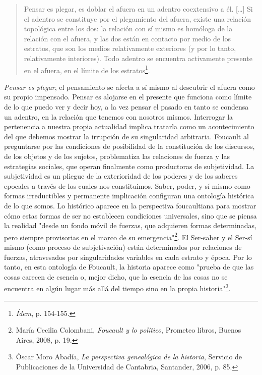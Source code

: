 \documentclass{book}
\begin{document}
\begin{quote}
Pensar es plegar, es doblar el afuera en un adentro coextensivo a él.
{[}\ldots{]} Si el adentro se constituye por el plegamiento del afuera,
existe una relación topológica entre los dos: la relación con sí mismo
es homóloga de la relación con el afuera, y las dos están en contacto
por medio de los estratos, que son los medios relativamente exteriores
(y por lo tanto, relativamente interiores). Todo adentro se encuentra
activamente presente en el afuera, en el límite de los
estratos\footnote{\emph{Ídem}, p. 154-155.}.
\end{quote}

\emph{Pensar es plegar}, el pensamiento se afecta a sí mismo al
descubrir el afuera como su propio impensado. Pensar es alojarse en el
presente que funciona como límite de lo que puedo ver y decir hoy, a la
vez pensar el pasado en tanto se condensa un adentro, en la relación que
tenemos con nosotros mismos. Interrogar la pertenencia a nuestra propia
actualidad implica tratarla como un acontecimiento del que debemos
mostrar la irrupción de su singularidad arbitraria. Foucault al
preguntarse por las condiciones de posibilidad de la constitución de los
discursos, de los objetos y de los sujetos, problematiza las relaciones
de fuerza y las estrategias sociales, que operan finalmente como
productoras de subjetividad. La subjetividad es un pliegue de la
exterioridad de los poderes y de los saberes epocales a través de los
cuales nos constituimos. Saber, poder, y sí mismo como formas
irreductibles y permanente implicación configuran una ontología
histórica de lo que somos. Lo histórico aparece en la perspectiva
foucaultiana para mostrar cómo estas formas de ser no establecen
condiciones universales, sino que se piensa la realidad "desde un fondo
móvil de fuerzas, que adquieren formas determinadas, pero siempre
provisorias en el marco de su emergencia"\footnote{María Cecilia
  Colombani, \emph{Foucault y lo político}, Prometeo libros, Buenos
  Aires, 2008, p. 19.}. El Ser-saber y el Ser-sí mismo (como proceso de
subjetivación) están determinados por relaciones de fuerzas, atravesados
por singularidades variables en cada estrato y época. Por lo tanto, en
esta ontología de Foucault, la historia aparece como "prueba de que las
cosas carecen de esencia o, mejor dicho, que la esencia de las cosas no
se encuentra en algún lugar más allá del tiempo sino en la propia
historia"\footnote{Óscar Moro Abadía, \emph{La perspectiva genealógica
  de la historia}, Servicio de Publicaciones de la Universidad de
  Cantabria, Santander, 2006, p. 85.}.
\end{document}
